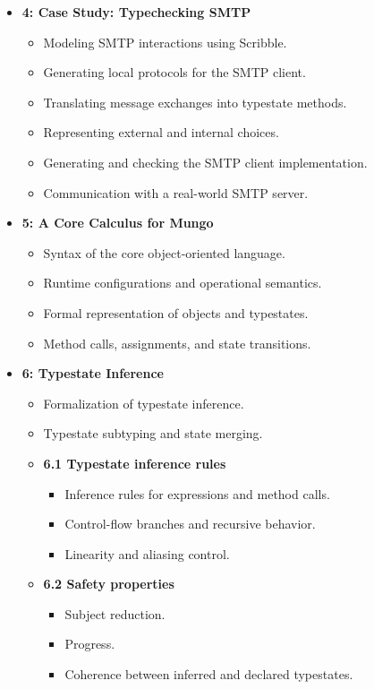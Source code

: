 \begin{itemize}
    \item \textbf{4: Case Study: Typechecking SMTP}
    \begin{itemize}
        \item Modeling SMTP interactions using Scribble.
        \item Generating local protocols for the SMTP client.
        \item Translating message exchanges into typestate methods.
        \item Representing external and internal choices.
        \item Generating and checking the SMTP client implementation.
        \item Communication with a real-world SMTP server.
    \end{itemize}

    \item \textbf{5: A Core Calculus for Mungo}
    \begin{itemize}
        \item Syntax of the core object-oriented language.
        \item Runtime configurations and operational semantics.
        \item Formal representation of objects and typestates.
        \item Method calls, assignments, and state transitions.
    \end{itemize}

    \item \textbf{6: Typestate Inference}
    \begin{itemize}
        \item Formalization of typestate inference.
        \item Typestate subtyping and state merging.
        \item \textbf{6.1 Typestate inference rules}
        \begin{itemize}
            \item Inference rules for expressions and method calls.
            \item Control-flow branches and recursive behavior.
            \item Linearity and aliasing control.
        \end{itemize}
        \item \textbf{6.2 Safety properties}
        \begin{itemize}
            \item Subject reduction.
            \item Progress.
            \item Coherence between inferred and declared typestates.
        \end{itemize}
    \end{itemize}


\end{itemize}
